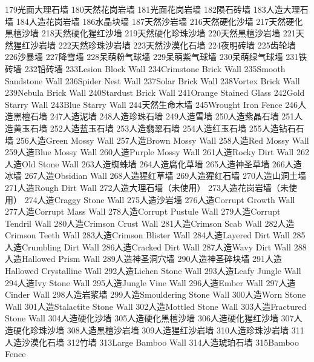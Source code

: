 {{	{179}{光面大理石墙}
	{180}{天然花岗岩墙}
	{181}{光面花岗岩墙}
	{182}{陨石砖墙}
	{183}{人造大理石墙}
	{184}{人造花岗岩墙}
	{186}{水晶块墙}
	{187}{天然沙岩墙}
	{216}{天然硬化沙墙}
	{217}{天然硬化黑檀沙墙}
	{218}{天然硬化猩红沙墙}
	{219}{天然硬化珍珠沙墙}
	{220}{天然黑檀沙岩墙}
	{221}{天然猩红沙岩墙}
	{222}{天然珍珠沙岩墙}
	{223}{天然沙漠化石墙}
	{224}{夜明砖墙}
	{225}{齿轮墙}
	{226}{沙暴墙}
	{227}{降雪墙}
	{228}{呆萌粉气球墙}
	{229}{呆萌紫气球墙}
	{230}{呆萌绿气球墙}
	{231}{铁砖墙}
	{232}{铅砖墙}
	{233}{Lesion Block Wall}
	{234}{Crimstone Brick Wall}
	{235}{Smooth Sandstone Wall}
	{236}{Spider Nest Wall}
	{237}{Solar Brick Wall}
	{238}{Vortex Brick Wall}
	{239}{Nebula Brick Wall}
	{240}{Stardust Brick Wall}
	{241}{Orange Stained Glass}
	{242}{Gold Starry Wall}
	{243}{Blue Starry Wall}
	{244}{天然生命木墙}
	{245}{Wrought Iron Fence}
	{246}{人造黑檀石墙}
	{247}{人造泥墙}
	{248}{人造珍珠石墙}
	{249}{人造雪墙}
	{250}{人造紫晶石墙}
	{251}{人造黄玉石墙}
	{252}{人造蓝玉石墙}
	{253}{人造翡翠石墙}
	{254}{人造红玉石墙}
	{255}{人造钻石石墙}
	{256}{人造Green Mossy Wall}
	{257}{人造Brown Mossy Wall}
	{258}{人造Red Mossy Wall}
	{259}{人造Blue Mossy Wall}
	{260}{人造Purple Mossy Wall}
	{261}{人造Rocky Dirt Wall}
	{262}{人造Old Stone Wall}
	{263}{人造蜘蛛墙}
	{264}{人造腐化草墙}
	{265}{人造神圣草墙}
	{266}{人造冰墙}
	{267}{人造Obsidian Wall}
	{268}{人造猩红草墙}
	{269}{人造猩红石墙}
	{270}{人造山洞土墙}
	{271}{人造Rough Dirt Wall}
	{272}{人造大理石墙（未使用）}
	{273}{人造花岗岩墙（未使用）}
	{274}{人造Craggy Stone Wall}
	{275}{人造沙岩墙}
	{276}{人造Corrupt Growth Wall}
	{277}{人造Corrupt Mass Wall}
	{278}{人造Corrupt Pustule Wall}
	{279}{人造Corrupt Tendril Wall}
	{280}{人造Crimson Crust Wall}
	{281}{人造Crimson Scab Wall}
	{282}{人造Crimson Teeth Wall}
	{283}{人造Crimson Blister Wall}
	{284}{人造Layered Dirt Wall}
	{285}{人造Crumbling Dirt Wall}
	{286}{人造Cracked Dirt Wall}
	{287}{人造Wavy Dirt Wall}
	{288}{人造Hallowed Prism Wall}
	{289}{人造神圣洞穴墙}
	{290}{人造神圣碎块墙}
	{291}{人造Hallowed Crystalline Wall}
	{292}{人造Lichen Stone Wall}
	{293}{人造Leafy Jungle Wall}
	{294}{人造Ivy Stone Wall}
	{295}{人造Jungle Vine Wall}
	{296}{人造Ember Wall}
	{297}{人造Cinder Wall}
	{298}{人造岩浆墙}
	{299}{人造Smouldering Stone Wall}
	{300}{人造Worn Stone Wall}
	{301}{人造Stalactite Stone Wall}
	{302}{人造Mottled Stone Wall}
	{303}{人造Fractured Stone Wall}
	{304}{人造硬化沙墙}
	{305}{人造硬化黑檀沙墙}
	{306}{人造硬化猩红沙墙}
	{307}{人造硬化珍珠沙墙}
	{308}{人造黑檀沙岩墙}
	{309}{人造猩红沙岩墙}
	{310}{人造珍珠沙岩墙}
	{311}{人造沙漠化石墙}
	{312}{竹墙}
	{313}{Large Bamboo Wall}
	{314}{人造琥珀石墙}
	{315}{Bamboo Fence}
}}

